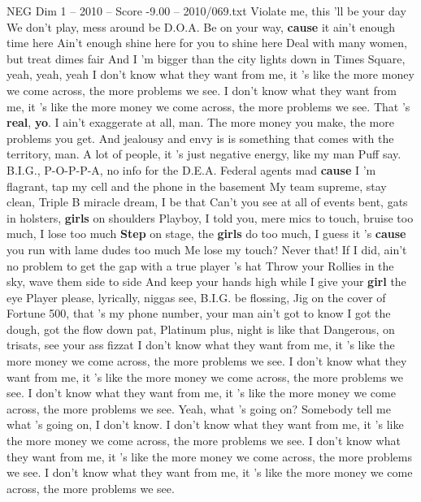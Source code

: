 \begin{textsample}{NEG Dim 1 – 2010 – Score -9.00 – 2010/069.txt}
Violate me, this 'll be your day We don't play, mess around be D.O.A.
Be on your way, \textbf{cause} it ain't enough time here Ain't enough shine here for you to shine here Deal with many women, but treat dimes fair And I 'm bigger than the city lights down in Times Square, yeah, yeah, yeah I don't know what they want from me, it 's like the more money we come across, the more problems we see.
I don't know what they want from me, it 's like the more money we come across, the more problems we see.
That 's \textbf{real}, \textbf{yo}.
I ain't exaggerate at all, man.
The more money you make, the more problems you get.
And jealousy and envy is is something that comes with the territory, man.
A lot of people, it 's just negative energy, like my man Puff say.
B.I.G., P-O-P-P-A, no info for the D.E.A.
Federal agents mad \textbf{cause} I 'm flagrant, tap my cell and the phone in the basement My team supreme, stay clean, Triple B miracle dream, I be that Can't you see at all of events bent, gats in holsters, \textbf{girls} on shoulders Playboy, I told you, mere mics to touch, bruise too much, I lose too much \textbf{Step} on stage, the \textbf{girls} do too much, I guess it 's \textbf{cause} you run with lame dudes too much Me lose my touch?
Never that!
If I did, ain't no problem to get the gap with a true player 's hat Throw your Rollies in the sky, wave them side to side And keep your hands high while I give your \textbf{girl} the eye Player please, lyrically, niggas see, B.I.G. be flossing, Jig on the cover of Fortune 500, that 's my phone number, your man ain't got to know I got the dough, got the flow down pat, Platinum plus, night is like that Dangerous, on trisats, see your ass fizzat I don't know what they want from me, it 's like the more money we come across, the more problems we see.
I don't know what they want from me, it 's like the more money we come across, the more problems we see.
I don't know what they want from me, it 's like the more money we come across, the more problems we see.
Yeah, what 's going on?
Somebody tell me what 's going on, I don't know.
I don't know what they want from me, it 's like the more money we come across, the more problems we see.
I don't know what they want from me, it 's like the more money we come across, the more problems we see.
I don't know what they want from me, it 's like the more money we come across, the more problems we see.

\end{textsample}
